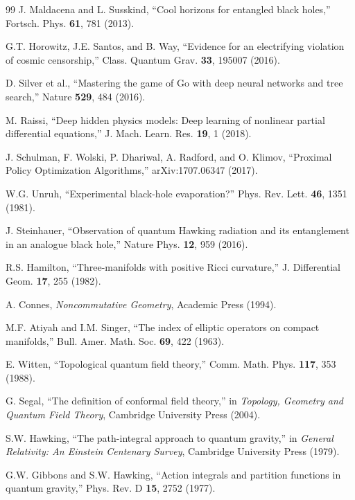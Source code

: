 \documentclass[12pt,a4paper]{article}
\begin{document}
\begin{thebibliography}{99}
J. Maldacena and L. Susskind, ``Cool horizons for entangled black holes,'' Fortsch. Phys. \textbf{61}, 781 (2013).

G.T. Horowitz, J.E. Santos, and B. Way, ``Evidence for an electrifying violation of cosmic censorship,'' Class. Quantum Grav. \textbf{33}, 195007 (2016).

D. Silver et al., ``Mastering the game of Go with deep neural networks and tree search,'' Nature \textbf{529}, 484 (2016).

M. Raissi, ``Deep hidden physics models: Deep learning of nonlinear partial differential equations,'' J. Mach. Learn. Res. \textbf{19}, 1 (2018).

J. Schulman, F. Wolski, P. Dhariwal, A. Radford, and O. Klimov, ``Proximal Policy Optimization Algorithms,'' arXiv:1707.06347 (2017).

W.G. Unruh, ``Experimental black-hole evaporation?'' Phys. Rev. Lett. \textbf{46}, 1351 (1981).

J. Steinhauer, ``Observation of quantum Hawking radiation and its entanglement in an analogue black hole,'' Nature Phys. \textbf{12}, 959 (2016).


R.S. Hamilton, ``Three-manifolds with positive Ricci curvature,'' J. Differential Geom. \textbf{17}, 255 (1982).

A. Connes, \textit{Noncommutative Geometry}, Academic Press (1994).

M.F. Atiyah and I.M. Singer, ``The index of elliptic operators on compact manifolds,'' Bull. Amer. Math. Soc. \textbf{69}, 422 (1963).

E. Witten, ``Topological quantum field theory,'' Comm. Math. Phys. \textbf{117}, 353 (1988).

G. Segal, ``The definition of conformal field theory,'' in \textit{Topology, Geometry and Quantum Field Theory}, Cambridge University Press (2004).

S.W. Hawking, ``The path-integral approach to quantum gravity,'' in \textit{General Relativity: An Einstein Centenary Survey}, Cambridge University Press (1979).

G.W. Gibbons and S.W. Hawking, ``Action integrals and partition functions in quantum gravity,'' Phys. Rev. D \textbf{15}, 2752 (1977).


\end{thebibliography}
\end{document}
